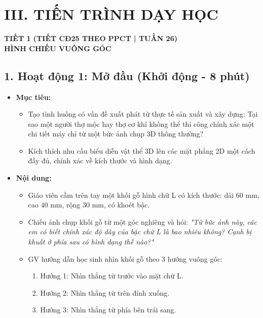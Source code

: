 \documentclass[12pt, a4paper]{article}
\begin{document}
\section*{III. TIẾN TRÌNH DẠY HỌC}

\begin{center}
    \textbf{\large TIẾT 1 (TIẾT CĐ25 THEO PPCT | TUẦN 26)}\\[4pt]
    \textbf{\large HÌNH CHIẾU VUÔNG GÓC}
\end{center}

\subsection*{1. Hoạt động 1: Mở đầu (Khởi động - 8 phút)}

\begin{itemize}[leftmargin=1.2cm]
    \item[a)] \textbf{Mục tiêu:}
    \begin{itemize}[leftmargin=0.6cm]
        \item Tạo tình huống có vấn đề xuất phát từ thực tế sản xuất và xây dựng: Tại sao một người thợ mộc hay thợ cơ khí không thể thi công chính xác một chi tiết máy chỉ từ một bức ảnh chụp 3D thông thường?
        \item Kích thích nhu cầu biểu diễn vật thể 3D lên các mặt phẳng 2D một cách đầy đủ, chính xác về kích thước và hình dạng.
    \end{itemize}

    \item[b)] \textbf{Nội dung:}
    \begin{itemize}[leftmargin=0.6cm]
        \item Giáo viên cầm trên tay một khối gỗ hình chữ L có kích thước: dài $60\text{ mm}$, cao $40\text{ mm}$, rộng $30\text{ mm}$, có khoét bậc.
        \item Chiếu ảnh chụp khối gỗ từ một góc nghiêng và hỏi: \textit{"Từ bức ảnh này, các em có biết chính xác độ dày của bậc chữ L là bao nhiêu không? Cạnh bị khuất ở phía sau có hình dạng thế nào?"}
        \item GV hướng dẫn học sinh nhìn khối gỗ theo 3 hướng vuông góc:
        \begin{enumerate}[leftmargin=0.6cm]
            \item Hướng 1: Nhìn thẳng từ trước vào mặt chữ L.
            \item Hướng 2: Nhìn thẳng từ trên đỉnh xuống.
            \item Hướng 3: Nhìn thẳng từ phía bên trái sang.
        \end{enumerate}
    \end{itemize}


\end{itemize}
\end{document}
